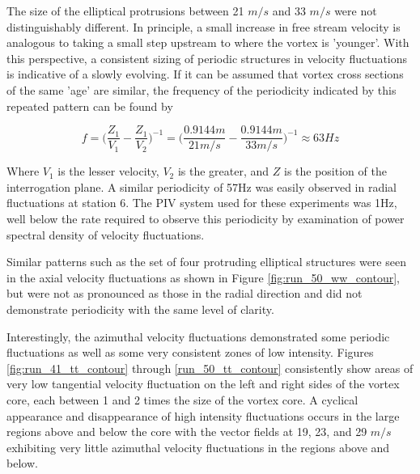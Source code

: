 










The size of the 
elliptical protrusions between 21 $m/s$ and 33 $m/s$ were not distinguishably 
different. In principle, a small increase in free stream velocity is analogous 
to taking a small step upstream to where the vortex is 'younger'. With this 
perspective, a consistent sizing of periodic structures in velocity 
fluctuations is indicative of a slowly evolving. If it can be assumed that 
vortex cross sections of the same 'age' are similar, the frequency of the 
periodicity indicated by this repeated pattern can be found by

\begin{equation}
f = \Big(\frac{Z_1}{V_1} - \frac{Z_1}{V_2}\Big)^{-1} = 
\Big(\frac{0.9144m}{21 m/s}-\frac{0.9144m}{33 m/s}\Big)^{-1} \approx 63 Hz
\label{eq:period_frequency}
\end{equation}

\noindent
Where $V_1$ is the lesser velocity, $V_2$ is the greater, and $Z$ is the 
position of the interrogation plane. A similar periodicity of 57Hz was easily
observed in radial fluctuations at station 6. The PIV system used for these 
experiments was 1Hz, well below the rate required to observe this periodicity 
by examination of power spectral density of velocity fluctuations.

Similar patterns such as the set of four protruding elliptical structures were 
seen in the axial velocity fluctuations as shown in 
Figure \ref{fig:run_50_ww_contour}, but were not as pronounced as those in the 
radial direction and did not demonstrate periodicity with the same level of 
clarity.



Interestingly, the azimuthal velocity fluctuations demonstrated some
periodic fluctuations as well as some very consistent zones of low intensity.
Figures \ref{fig:run_41_tt_contour} through \ref{run_50_tt_contour} 
consistently show areas of very low tangential velocity fluctuation on the left 
and right sides of the vortex core, each between 1 and 2 times the size of the 
vortex core. A cyclical appearance and disappearance of high intensity 
fluctuations occurs in the large regions above and below the core with the 
vector fields at 19, 23, and 29 $m/s$ exhibiting very little azimuthal velocity 
fluctuations in the regions above and below.

